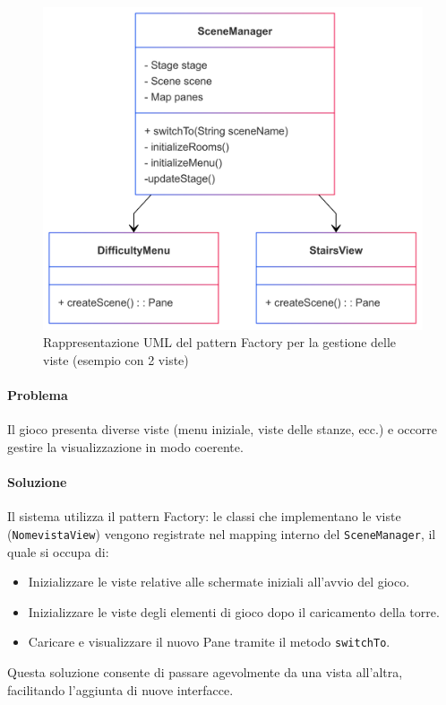 \documentclass[a4paper,12pt]{report}
\begin{document}
\begin{figure}[H]
\centering{}
\includegraphics[width=\textwidth]{img/scenemanager.png}
\caption{Rappresentazione UML del pattern Factory per la gestione delle viste (esempio con 2 viste)}
\label{img:factory}
\end{figure}

\paragraph{Problema} Il gioco presenta diverse viste (menu iniziale, viste delle stanze, ecc.) e occorre gestire la visualizzazione in modo coerente.
  
\paragraph{Soluzione} Il sistema utilizza il pattern Factory: le classi che implementano le viste (\texttt{NomevistaView}) vengono registrate nel mapping interno del \texttt{SceneManager}, il quale si occupa di:
\begin{itemize}
	\item Inizializzare le viste relative alle schermate iniziali all'avvio del gioco.
	\item Inizializzare le viste degli elementi di gioco dopo il caricamento della torre.
	\item Caricare e visualizzare il nuovo Pane tramite il metodo \texttt{switchTo}.
\end{itemize}
Questa soluzione consente di passare agevolmente da una vista all'altra, facilitando l'aggiunta di nuove interfacce.
\end{document}
